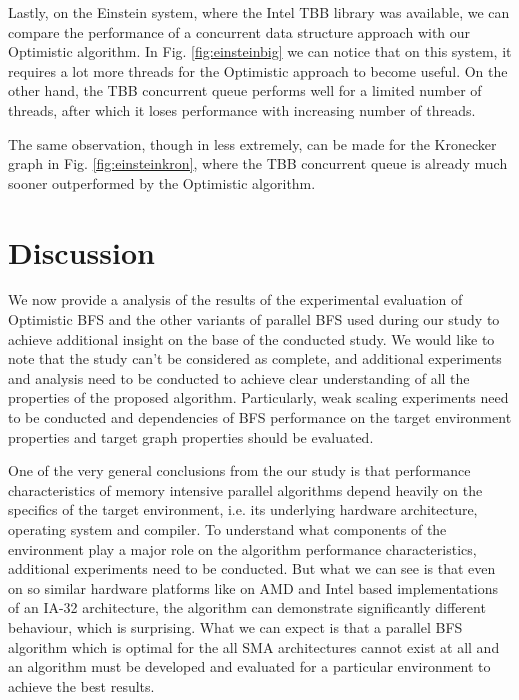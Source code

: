 \documentclass[letterpaper]{article}
\begin{document}
		Lastly, on the Einstein system, where the Intel TBB library was available, we can compare the performance of a concurrent data structure approach with our Optimistic algorithm.
		In Fig. \ref{fig:einsteinbig} we can notice that on this system, it requires a lot more threads for the Optimistic approach to become useful. On the other hand, the TBB concurrent queue performs well for a limited number of threads, after which it loses performance with increasing number of threads.
		
		The same observation, though in less extremely, can be made for the Kronecker graph in Fig. \ref{fig:einsteinkron}, where the TBB concurrent queue is already much sooner outperformed by the Optimistic algorithm.


	\section{Discussion}\label{sec:disc} %
		We now provide a analysis of the results of the experimental evaluation of Optimistic BFS and the other variants of parallel BFS used during our study to achieve additional insight on the base of the conducted study.
		We would like to note that the study can't be considered as complete, and additional experiments and analysis need to be conducted to achieve clear understanding of all the properties of the proposed algorithm.  
		Particularly, weak scaling experiments need to be conducted and dependencies of BFS performance on the target environment properties and target graph properties should be evaluated. 
		
		One of the very general conclusions from the our study is that performance characteristics of memory intensive parallel algorithms depend heavily on the specifics of the target environment, i.e. its underlying hardware architecture, operating system and compiler.
		To understand what components of the environment play a major role on the algorithm performance characteristics, additional experiments need to be conducted.
		But what we can see is that even on so similar hardware platforms like on AMD and Intel based implementations of an IA-32 architecture, the algorithm can demonstrate significantly different behaviour, which is surprising.
		What we can expect is that a parallel BFS algorithm which is optimal for the all SMA architectures cannot exist at all and an algorithm must be developed and evaluated for a particular environment to achieve the best results.
		
\end{document}
